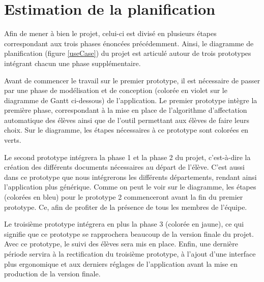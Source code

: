 \chapter{Estimation de la planification}

Afin de mener à bien le projet, celui-ci est divisé en plusieurs étapes correspondant aux trois phases énoncées précédemment.  Ainsi, le diagramme de planification (figure \ref{useCase}) du projet est articulé autour de trois prototypes intégrant chacun une phase supplémentaire. 

Avant de commencer le travail sur le premier prototype, il est nécessaire de passer par une phase de modélisation et de conception (colorée en violet sur le diagramme de Gantt ci-dessous) de l'application.
Le premier prototype intègre la première phase, correspondant à la mise en place de l'algorithme d'affectation automatique des élèves ainsi que de l'outil permettant aux élèves de faire leurs choix. Sur le diagramme, les étapes nécessaires à ce prototype sont colorées en verts.

Le second prototype intégrera la phase 1 et la phase 2 du projet, c'est-à-dire la création des différents documents nécessaires au départ de l'élève. C'est aussi dans ce prototype que nous intégrerons les différents départements, rendant ainsi l'application plus générique. Comme on peut le voir sur le diagramme, les étapes (colorées en bleu) pour le prototype 2 commenceront avant la fin du premier prototype. Ce, afin de profiter de la présence de tous les membres de l'équipe.

Le troisième prototype intégrera en plus la phase 3 (colorée en jaune), ce qui signifie que ce prototype se rapprochera beaucoup de la version finale du projet. Avec ce prototype, le suivi des élèves sera mis en place.
Enfin, une dernière période servira à la rectification du troisième prototype, à l'ajout d'une interface plus ergonomique et aux derniers réglages de l'application avant la mise en production de la version finale. 

